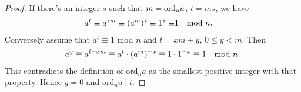 \begin{mysubsection}{}
    \begin{proof}
        If there's an integer $s$ such that $m=\textnormal{ord}_na$, $t=ms$, we have
        \begin{alignat*}{1}
            a^t\equiv a^{sm} \equiv (a^m)^s\equiv 1^s\equiv &1\quad \textnormal{mod }n.
        \end{alignat*}
        Conversely assume that $a^t\equiv 1$ mod $n$ and $t=xm+y$, $0\leq y<m$. Then
        \begin{alignat*}{1}
            a^y\equiv a^{t-xm}\equiv a^t\cdot (a^m)^{-x}\equiv 1\cdot 1^{-x}\equiv 1\quad \textnormal{mod }n.
        \end{alignat*}
        This contradicts the definition of ord$_na$ as the smallest positive integer with that property. Hence $y=0$ and ord$_na\mid t$.
    \end{proof}
\end{mysubsection}

\mynewpage
\begin{shortque}[]{}


\end{shortque}
